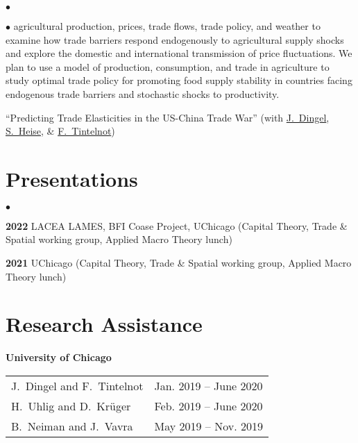 \documentclass[margin,line]{res}
\newenvironment{list0}{
  \begin{list}{$\bullet$}{%
      \setlength{\itemsep}{0in}
      \setlength{\parsep}{0in} \setlength{\parskip}{0in}
      \setlength{\topsep}{0in} \setlength{\partopsep}{0in}
      \setlength{\leftmargin}{0.0in}}}{\end{list}}
\newenvironment{list1}{
  \begin{list}{$\bullet$}{%
      \setlength{\itemsep}{0in}
      \setlength{\parsep}{0in} \setlength{\parskip}{0in}
      \setlength{\topsep}{0in} \setlength{\partopsep}{0in}
      \setlength{\leftmargin}{0.17in}}}{\end{list}}
\begin{document}
\begin{resume}
\begin{list0}
\begin{list1}
        agricultural production, prices, trade flows, trade policy, and weather
        to examine how trade barriers respond endogenously to agricultural
        supply shocks and explore the domestic and international transmission of
        price fluctuations. We plan to use a model of production, consumption,
        and trade in agriculture to study optimal trade policy for promoting
        food supply stability in countries facing endogenous trade barriers and
        stochastic shocks to productivity.
    \end{list1}
    \vspace*{2mm}
    \item[] ``Predicting Trade Elasticities in the US-China Trade War''
    (with \href{http://www.jdingel.com/}{J.~Dingel},
    \href{https://www.sebastianheise.com/}{S.~Heise}, \&
    \href{https://www.felix-tintelnot.com/}{F.~Tintelnot})
\end{list0}


\section{\sc Presentations}

\begin{list0}
    \item[\phantom{2022}\textbf{2022}] LACEA LAMES, BFI Coase Project,
    UChicago (Capital Theory, Trade \& Spatial working group, Applied Macro Theory lunch)
    \item[\phantom{2021}\textbf{2021}]
    UChicago (Capital Theory, Trade \& Spatial working group, Applied Macro Theory lunch)
\end{list0}


\section{\sc Research Assistance}
\textbf{University of Chicago}
\vspace*{-2mm}

\begin{tabular}{ll}
    J.~Dingel and F.~Tintelnot & Jan. 2019 -- June 2020 \\
    H.~Uhlig and D.~Kr{\"u}ger & Feb. 2019 -- June 2020 \\
    B.~Neiman and J.~Vavra & May 2019 -- Nov. 2019
\end{tabular}


\end{resume}
\end{document}
